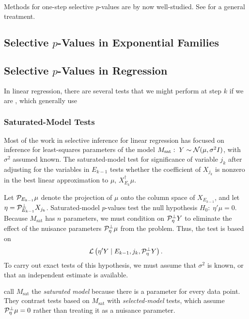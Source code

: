 \documentclass{article}
\begin{document}
Methods for one-step selective $p$-values are by now well-studied.  See \citet{fithian2014optimal} for a general treatment. 


\subsection{Selective $p$-Values in Exponential Families}



\subsection{Selective $p$-Values in Regression}

In linear regression, there are several tests that we might perform at step $k$ if we are , which generally use 

\subsubsection{Saturated-Model Tests}
Most of the work in selective inference for linear regression has focused on inference for least-squares parameters of the model $M_{\text{sat}}:\; Y \sim \mathcal{N}(\mu, \sigma^2I)$, with $\sigma^2$ assumed known. The saturated-model test for significance of variable $j_k$ after adjusting for the variables in $E_{k-1}$ tests whether the coefficient of $X_{j_k}$ is nonzero in the best linear approximation to $\mu$, $X_{E_k}^\dagger \mu$. 

Let $\mathcal{P}_{E_{k-1}}\mu$ denote the projection of $\mu$ onto the column space of $X_{E_{k-1}}$, and let $\eta = \mathcal{P}_{E_{k-1}}^\perp X_{j_k}$. Saturated-model $p$-values test the null hypothesis $H_0:\;\eta'\mu = 0$. Because $M_{\text{sat}}$ has $n$ parameters, we must  condition on $\mathcal{P}_\eta^\perp Y$ to eliminate the effect of the nuisance parameters $\mathcal{P}_\eta^\perp \mu$ from the problem. Thus, the test is based on
\begin{equation}\label{eq:satModel}
\mathcal{L}\left( \eta'Y \mid E_{k-1}, j_k, \mathcal{P}_\eta^\perp Y \right).
\end{equation}
To carry out exact tests of this hypothesis, we must assume that $\sigma^2$ is known, or that an independent estimate is available.

 \citet{fithian2014optimal} call $M_{\text{sat}}$ the {\em saturated model} because there is a parameter for every data point. They contrast tests based on $M_{\text{sat}}$ with {\em selected-model} tests, which assume $\mathcal{P}_\eta^\perp \mu=0$ rather than treating it as a nuisance parameter. 
\end{document}
